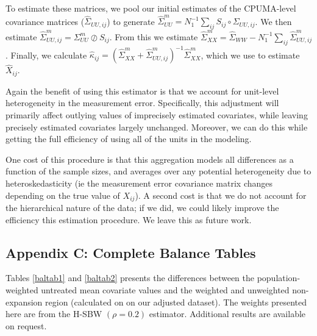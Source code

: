\documentclass[12pt]{article}
\begin{document}
To estimate these matrices, we pool our initial estimates of the CPUMA-level covariance matrices ($\hat{\Sigma}_{UU, ij}$) to generate $\hat{\Sigma}_{UU}^m = N_1^{-1}\sum_{ij} S_{ij} \circ \Sigma_{UU, ij}$. We then estimate $\hat{\Sigma}_{UU, ij}^m = \Sigma_{UU}^m \oslash S_{ij}$. From this we estimate $\hat{\Sigma}^m_{XX} = \hat{\Sigma}_{WW} - N_1^{-1}\sum_{ij}\hat{\Sigma}^m_{UU, ij}$. Finally, we calculate $\hat{\kappa}_{ij} = (\hat{\Sigma}^m_{XX} + \hat{\Sigma}^m_{UU, ij})^{-1}\hat{\Sigma}^m_{XX}$, which we use to estimate $\hat{X}_{ij}$. 

Again the benefit of using this estimator is that we account for unit-level heterogeneity in the measurement error. Specifically, this adjustment will primarily affect outlying values of imprecisely estimated covariates, while leaving precisely estimated covariates largely unchanged. Moreover, we can do this while getting the full efficiency of using all of the units in the modeling. 

One cost of this procedure is that this aggregation models all differences as a function of the sample sizes, and averages over any potential heterogeneity due to heteroskedasticity (ie the measurement error covariance matrix changes depending on the true value of $X_{ij}$). A second cost is that we do not account for the hierarchical nature of the data; if we did, we could likely improve the efficiency this estimation procedure. We leave this as future work.

\subsection{Appendix C: Complete Balance Tables}

Tables \ref{baltab1} and \ref{baltab2} presents the differences between the population-weighted untreated mean covariate values and the weighted and unweighted non-expansion region (calculated on on our adjusted dataset). The weights presented here are from the H-SBW $(\rho = 0.2)$ estimator. Additional results are available on request.
\end{document}
